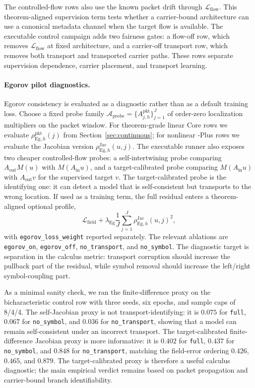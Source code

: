The controlled-flow rows also use the known packet drift through $\mathcal L_{\mathrm{flow}}$.  This theorem-aligned supervision term tests whether a carrier-bound architecture can use a canonical metadata channel when the target flow is available.  The executable control campaign adds two fairness gates: a flow-off row, which removes $\mathcal L_{\mathrm{flow}}$ at fixed architecture, and a carrier-off transport row, which removes both transport and transported carrier paths.  These rows separate supervision dependence, carrier placement, and transport learning.

\paragraph{Egorov pilot diagnostics.}
Egorov consistency is evaluated as a diagnostic rather than as a default training loss.  Choose a fixed probe family $\mathcal A_{\mathrm{probe}}=\{A_{j,h}^{\mathrm{pkt}}\}_{j=1}^{J}$ of order-zero localization multipliers on the packet window.  For theorem-grade linear Core rows we evaluate $\rho_{\mathrm{Eg},h}^{\mathrm{pkt}}(j)$ from Section~\ref{sec:continuous}; for nonlinear \MiNO-Plus rows we evaluate the Jacobian version $\rho_{\mathrm{Eg},h}^{\mathrm{Jac}}(u,j)$.  The executable runner also exposes two cheaper controlled-flow probes: a self-intertwining probe comparing $A_{\mathrm{out}}M(u)$ with $M(A_{\mathrm{in}}u)$, and a target-calibrated probe comparing $M(A_{\mathrm{in}}u)$ with $A_{\mathrm{out}}v$ for the supervised target $v$.  The target-calibrated probe is the identifying one: it can detect a model that is self-consistent but transports to the wrong location.  If used as a training term, the full residual enters a theorem-aligned optional profile,
\[
\mathcal L_{\mathrm{field}}
+\lambda_{\mathrm{Eg}}
\frac1J\sum_{j=1}^{J}
\rho_{\mathrm{Eg},h}^{\mathrm{Jac}}(u,j)^2,
\]
with \texttt{egorov\_loss\_weight} reported separately.  The relevant ablations are \texttt{egorov\_on}, \texttt{egorov\_off}, \texttt{no\_transport}, and \texttt{no\_symbol}.  The diagnostic target is separation in the calculus metric: transport corruption should increase the pullback part of the residual, while symbol removal should increase the left/right symbol-coupling part.

As a minimal sanity check, we ran the finite-difference proxy on the bicharacteristic control row with three seeds, six epochs, and sample caps of 8/4/4.  The self-Jacobian proxy is not transport-identifying: it is $0.075$ for \texttt{full}, $0.067$ for \texttt{no\_symbol}, and $0.036$ for \texttt{no\_transport}, showing that a model can remain self-consistent under an incorrect transport.  The target-calibrated finite-difference Jacobian proxy is more informative: it is $0.402$ for \texttt{full}, $0.437$ for \texttt{no\_symbol}, and $0.848$ for \texttt{no\_transport}, matching the field-error ordering $0.426$, $0.465$, and $0.879$.  The target-calibrated proxy is therefore a useful calculus diagnostic; the main empirical verdict remains based on packet propagation and carrier-bound branch identifiability.

